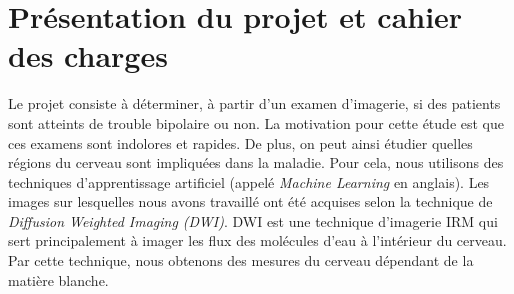 \chapter{Présentation du projet et cahier des charges}

Le projet consiste à déterminer, à partir d'un examen d'imagerie, si des patients sont atteints de trouble bipolaire ou non.
La motivation pour cette étude est que ces examens sont indolores et rapides.
De plus, on peut ainsi étudier quelles régions du cerveau sont impliquées dans la maladie.
Pour cela, nous utilisons des techniques d'apprentissage artificiel (appelé \textit{Machine Learning} en anglais).
Les images sur lesquelles nous avons travaillé ont été acquises selon la technique de 
\textit{Diffusion Weighted Imaging (DWI)}.
DWI est une technique d'imagerie IRM qui sert principalement à imager les flux des molécules d'eau à l'intérieur du cerveau.
Par cette technique, nous obtenons des mesures du cerveau dépendant de la matière blanche. 






